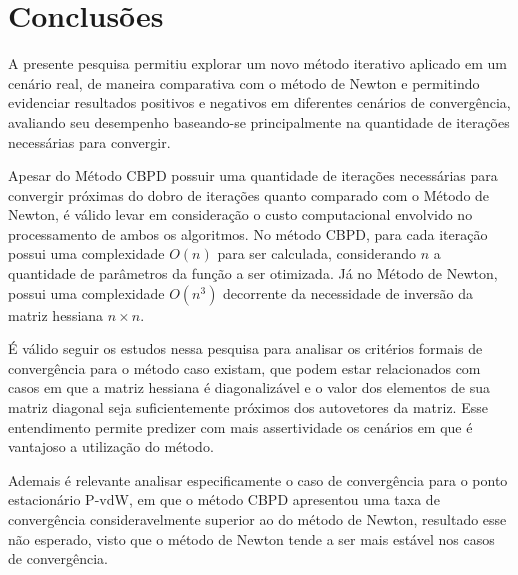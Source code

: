 \section{Conclusões}

A presente pesquisa permitiu explorar um novo método iterativo aplicado em um cenário real, de maneira comparativa com o método de Newton e permitindo evidenciar resultados positivos e negativos em diferentes cenários de convergência, avaliando seu desempenho baseando-se principalmente na quantidade de iterações necessárias para convergir.

Apesar do Método CBPD possuir uma quantidade de iterações necessárias para convergir próximas do dobro de iterações quanto comparado com o Método de Newton, é válido levar em consideração o custo computacional envolvido no processamento de ambos os algoritmos. No método CBPD, para cada iteração possui uma complexidade $O(n)$ para ser calculada, considerando $n$ a quantidade de parâmetros da função a ser otimizada. Já no Método de Newton, possui uma complexidade $O(n^3)$ decorrente da necessidade de inversão da matriz hessiana $n \times n$.

É válido seguir os estudos nessa pesquisa para analisar os critérios formais de convergência para o método caso existam, que podem estar relacionados com casos em que a matriz hessiana é diagonalizável e o valor dos elementos de sua matriz diagonal seja suficientemente próximos dos autovetores da matriz. Esse entendimento permite predizer com mais assertividade os cenários em que é vantajoso a utilização do método.

Ademais é relevante analisar especificamente o caso de convergência para o ponto estacionário P-vdW, em que o método CBPD apresentou uma taxa de convergência consideravelmente superior ao do método de Newton, resultado esse não esperado, visto que o método de Newton tende a ser mais estável nos casos de convergência.
